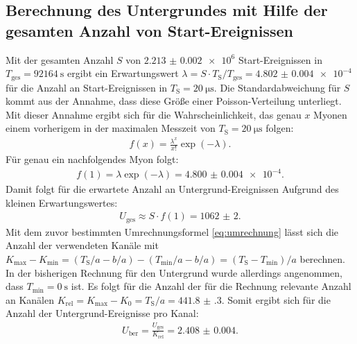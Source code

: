 \subsection{Berechnung des Untergrundes mit Hilfe der gesamten Anzahl von Start-Ereignissen}
\label{subsec:Berechnung}
Mit der gesamten Anzahl $S$ von $\num{2.213(2)e6}$ Start-Ereignissen in $T_\text{ges}=\SI{92164}{\second}$ ergibt ein Erwartungswert $\lambda=S \cdot T_\text{S}/T_\text{ges}=\num{4.802(4)e-4}$ für die Anzahl an Start-Ereignissen in $T_\text{S}=\SI{20}{\micro\second}$. Die Standardabweichung für $S$ kommt aus der Annahme, dass diese Größe einer Poisson-Verteilung unterliegt. Mit dieser Annahme ergibt sich für die Wahrscheinlichkeit, das genau $x$ Myonen einem vorherigem in der maximalen Messzeit von $T_\text{S}=\SI{20}{\micro\second}$ folgen: 
\begin{gather*}
f(x)=\frac{\lambda^x}{x!}\exp(-\lambda).
\end{gather*}
Für genau ein nachfolgendes Myon folgt:
\begin{gather*}
f(1)=\lambda\exp(-\lambda)=\num{4.800(4)e-4}.
\end{gather*}
Damit folgt für die erwartete Anzahl an Untergrund-Ereignissen Aufgrund des kleinen Erwartungswertes:
\begin{gather*}
U_\text{ges}\approx S \cdot f(1) =\num{1062(2)}.
\end{gather*}
Mit dem zuvor bestimmten Umrechnungsformel \eqref{eq:umrechnung} lässt sich die Anzahl der verwendeten Kanäle mit $K_\text{max}-K_\text{min}=(T_\text{S}/a -b/a)-(T_\text{min}/a-b/a)= (T_\text{S}-T_\text{min})/a$ berechnen. In der bisherigen Rechnung für den Untergrund wurde allerdings angenommen, dass $T_\text{min} = \SI{0}{\second}$ ist. Es folgt für die Anzahl der für die Rechnung relevante Anzahl an Kanälen $K_\text{rel}=K_\text{max}-K_0= T_\text{S}/a=\num{441.8(3)}$.
Somit ergibt sich für die Anzahl der Untergrund-Ereignisse pro Kanal:
\begin{gather*}
U_\text{ber}=\frac{U_\text{ges}}{K_\text{rel}} =\num{2.408(4)}.
\end{gather*}

